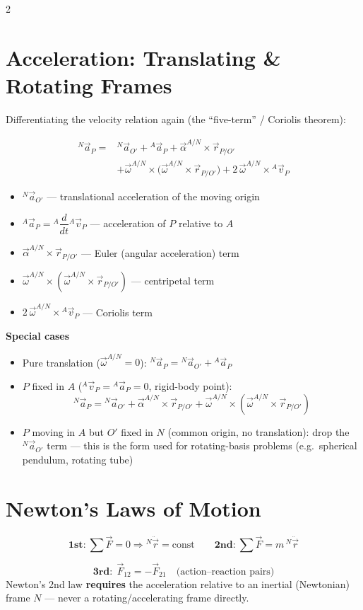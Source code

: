 \documentclass[10pt]{article}
\newcommand{\rate}[2]{{}^{#1}\dfrac{d}{dt}#2}
\begin{document}
\begin{multicols}{2}
\section*{Acceleration: Translating \& Rotating Frames}
Differentiating the velocity relation again (the ``five-term'' / Coriolis theorem):
\begin{keybox}
\begin{align*}
    {}^{N}\vec a_P ={}& {}^{N}\vec a_{O'} + {}^{A}\vec a_P
    + \vec\alpha^{A/N}\times\vec r_{P/O'} \\
    &+ \vec\omega^{A/N}\times\big(\vec\omega^{A/N}\times\vec r_{P/O'}\big)
    + 2\,\vec\omega^{A/N}\times {}^{A}\vec v_P
\end{align*}
\end{keybox}
\begin{itemize}[nosep, leftmargin=1.1em]
    \item ${}^{N}\vec a_{O'}$ --- translational acceleration of the moving origin
    \item ${}^{A}\vec a_P = \rate{A}{{}^{A}\vec v_P}$ --- acceleration of $P$ relative to $A$
    \item $\vec\alpha^{A/N}\times\vec r_{P/O'}$ --- Euler (angular acceleration) term
    \item $\vec\omega^{A/N}\times(\vec\omega^{A/N}\times\vec r_{P/O'})$ --- centripetal term
    \item $2\,\vec\omega^{A/N}\times {}^{A}\vec v_P$ --- Coriolis term
\end{itemize}
\textbf{Special cases}
\begin{itemize}[nosep, leftmargin=1.1em]
    \item Pure translation ($\vec\omega^{A/N}=0$): ${}^{N}\vec a_P = {}^{N}\vec a_{O'} + {}^{A}\vec a_P$
    \item $P$ fixed in $A$ (${}^{A}\vec v_P={}^{A}\vec a_P=0$, rigid-body point):
    \[
        {}^{N}\vec a_P = {}^{N}\vec a_{O'} + \vec\alpha^{A/N}\times\vec r_{P/O'} + \vec\omega^{A/N}\times(\vec\omega^{A/N}\times\vec r_{P/O'})
    \]
    \item $P$ moving in $A$ but $O'$ fixed in $N$ (common origin, no translation): drop the ${}^{N}\vec a_{O'}$ term --- this is the form used for rotating-basis problems (e.g.\ spherical pendulum, rotating tube)
\end{itemize}

\section*{Newton's Laws of Motion}
\begin{keybox}
\[
    \textbf{1st:}\ \textstyle\sum\vec F=0 \Rightarrow {}^{N}\ddot{\vec r}=\text{const}
    \qquad
    \textbf{2nd:}\ \textstyle\sum\vec F = m\,{}^{N}\ddot{\vec r}
\]
\end{keybox}
\[
    \textbf{3rd:}\ \ \vec F_{12} = -\vec F_{21}\quad\text{(action--reaction pairs)}
\]
Newton's 2nd law \textbf{requires} the acceleration relative to an inertial (Newtonian) frame $N$ --- never a rotating/accelerating frame directly.


\end{multicols}
\end{document}
